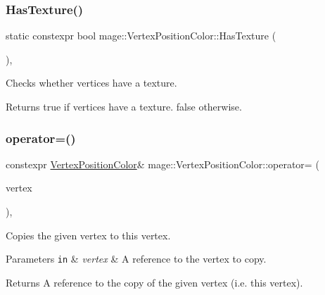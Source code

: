 \subsubsection{\texorpdfstring{Has\+Texture()}{HasTexture()}}
{\footnotesize\ttfamily static constexpr bool mage\+::\+Vertex\+Position\+Color\+::\+Has\+Texture (\begin{DoxyParamCaption}{ }\end{DoxyParamCaption})\hspace{0.3cm}{\ttfamily [static]}, {\ttfamily [noexcept]}}

Checks whether vertices have a texture.

\begin{DoxyReturn}{Returns}
{\ttfamily true} if vertices have a texture. {\ttfamily false} otherwise. 
\end{DoxyReturn}
\hypertarget{structmage_1_1_vertex_position_color_a76e9a602b85191a4651610fb8f99a541}{}\label{structmage_1_1_vertex_position_color_a76e9a602b85191a4651610fb8f99a541} 
\subsubsection{\texorpdfstring{operator=()}{operator=()}\hspace{0.1cm}{\footnotesize\ttfamily [1/2]}}
{\footnotesize\ttfamily constexpr \hyperlink{structmage_1_1_vertex_position_color}{Vertex\+Position\+Color}\& mage\+::\+Vertex\+Position\+Color\+::operator= (\begin{DoxyParamCaption}\item[{const \hyperlink{structmage_1_1_vertex_position_color}{Vertex\+Position\+Color} \&}]{vertex }\end{DoxyParamCaption})\hspace{0.3cm}{\ttfamily [default]}, {\ttfamily [noexcept]}}

Copies the given vertex to this vertex.


\begin{DoxyParams}[1]{Parameters}
\mbox{\tt in}  & {\em vertex} & A reference to the vertex to copy. \\
\hline
\end{DoxyParams}
\begin{DoxyReturn}{Returns}
A reference to the copy of the given vertex (i.\+e. this vertex). 
\end{DoxyReturn}
\hypertarget{structmage_1_1_vertex_position_color_a02ad0c89f38799200a0b475a45fbbcd6}{}\label{structmage_1_1_vertex_position_color_a02ad0c89f38799200a0b475a45fbbcd6} 
